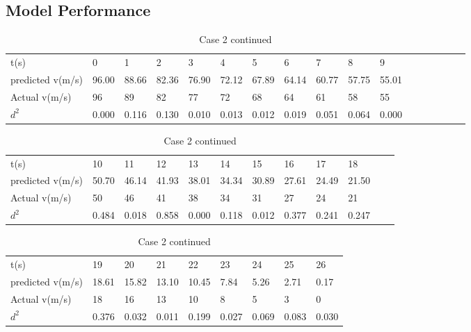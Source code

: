 \subsection{Model Performance}

\begin{table}[H]
\centering
    \begin{tabular}{|l|l|l|l|l|l|l|l|l|l|l|l|l|l|l|l|l|}
        \hline
        t(s) & 0 & 1 & 2 & 3 & 4 & 5 & 6 & 7 & 8 & 9 \\ \cline{1-11} 
        predicted v(m/s) & 96.00 & 88.66 & 82.36 & 76.90 & 72.12 & 67.89 & 64.14 & 60.77 & 57.75 & 55.01
        \\ \cline{1-11}
        Actual v(m/s) & 96 & 89 & 82 & 77 & 72 & 68 & 64 & 61 & 58 & 55 \\ \cline{1-11}
        $d^2$ & 0.000 & 0.116 & 0.130 & 0.010 & 0.013 & 0.012 & 0.019 & 0.051 & 0.064 & 0.000 \\ \cline{1-11}
    \end{tabular}
    \caption{Case 1}
    \vspace{0.5cm}

    \begin{tabular}{|l|l|l|l|l|l|l|l|l|l|l|l|}
        \hline
        t(s) & 10 & 11 & 12 & 13 & 14 & 15 & 16 & 17 & 18 \\ \cline{1-10}
        predicted v(m/s) & 50.70 & 46.14 & 41.93 & 38.01 & 34.34 & 30.89 & 27.61 & 24.49 & 21.50 \\ \cline{1-10}
        Actual v(m/s) & 50 & 46 & 41 & 38 & 34 & 31 & 27 & 24 & 21 \\ \cline{1-10}
        $d^2$ & 0.484 & 0.018 & 0.858 & 0.000 & 0.118 & 0.012 & 0.377 & 0.241 & 0.247 \\ \cline{1-10}
    \end{tabular}
    \caption{Case 2}
    \vspace{0.5cm}
    
    \begin{tabular}{|l|l|l|l|l|l|l|l|l|}
        \hline
        t(s) & 19 & 20 & 21 & 22 & 23 & 24 & 25 & 26 \\ \cline{1-9}
        predicted v(m/s) & 18.61 & 15.82 & 13.10 & 10.45 & 7.84 & 5.26 & 2.71 & 0.17 \\ \cline{1-9}
        Actual v(m/s) & 18 & 16 & 13 & 10 & 8 & 5 & 3 & 0
        \\ \cline{1-9}
        $d^2$ & 0.376 & 0.032 & 0.011 & 0.199 & 0.027 & 0.069 & 0.083 & 0.030 \\ \cline{1-9}
    \end{tabular}
    \caption{Case 2 continued}
    \vspace{0.5cm}
\end{table}

